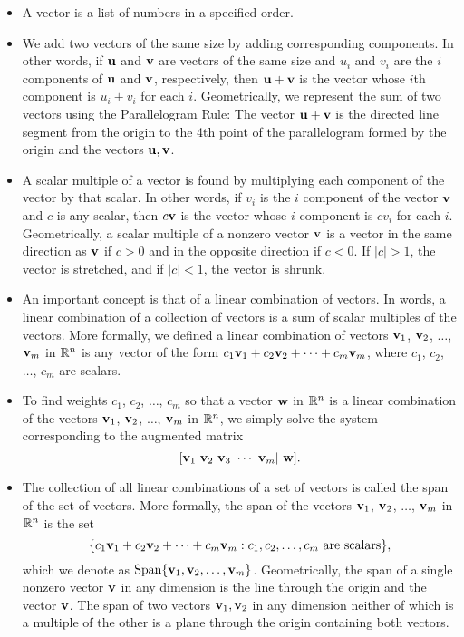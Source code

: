 \begin{itemize}
\item A vector is a list of numbers in a specified order. 
\item We add two vectors of the same size by adding corresponding components. In other words, if $\mathbf{u}$ and $\mathbf{v}$ are vectors of the same size and $u_i$ and $v_i$ are the $i$ components of $\mathbf{u}$ and $\mathbf{v}$, respectively, then $\mathbf{u} +\mathbf{v}$ is the vector whose $i$th component is $u_i+v_i$ for each $i$. Geometrically, we represent the sum of two vectors using the Parallelogram Rule: The vector $\mathbf{u}+\mathbf{v}$ is the directed line segment from the origin to the 4th point of the parallelogram formed by the origin and the vectors $\mathbf{u}, \mathbf{v}$.
\item A scalar multiple of a vector is found by multiplying each component of the vector by that scalar. In other words, if $v_i$ is the $i$ component of the vector $\mathbf{v}$ and $c$ is any scalar, then $c\mathbf{v}$ is the vector whose $i$ component is $cv_i$ for each $i$. Geometrically, a scalar multiple of a nonzero vector $\mathbf{v}$ is a vector in the same direction as $\mathbf{v}$ if $c>0$ and in the opposite direction if $c<0$. If $|c|>1$, the vector is stretched, and if $|c|<1$, the vector is shrunk.
\item An important concept is that of a linear combination of vectors. In words, a linear combination of a collection of vectors is a sum of scalar multiples of the vectors. More formally, we defined a linear combination of vectors $\mathbf{v}_1$, $\mathbf{v}_2$, $\ldots$, $\mathbf{v}_m$ in $\mathbb{R}^n$ is any vector of the form $c_1 \mathbf{v}_1 + c_2 \mathbf{v}_2 + \cdots + c_m \mathbf{v}_m$, where $c_1$, $c_2$, $\ldots$, $c_m$ are scalars.
\item To find weights $c_1$, $c_2$, $\ldots$, $c_m$ so that a vector $\mathbf{w}$ in $\mathbb{R}^n$ is a linear combination of the vectors $\mathbf{v}_1$, $\mathbf{v}_2$, $\ldots$, $\mathbf{v}_m$ in $\mathbb{R}^n$, we simply solve the system corresponding to the augmented matrix
\[[\vv_1 \  \vv_2 \  \vv_3 \ \cdots \ \vv_m | \ \vw].\]
\item The collection of all linear combinations of a set of vectors is called the span of the set of vectors. More formally, the span of the vectors $\mathbf{v}_1$, $\mathbf{v}_2$, $\ldots$, $\mathbf{v}_m$ in $\mathbb{R}^n$ is the set
\[\{c_1\mathbf{v}_1 + c_2\mathbf{v}_2 + \cdots + c_m\mathbf{v}_m : c_1, c_2, \ldots, c_m \text{ are scalars}\},\]
which we denote as $\text{Span} \{\mathbf{v}_1, \mathbf{v}_2, \ldots, \mathbf{v}_m\}$. 
Geometrically, the span of a single nonzero vector $\mathbf{v}$ in any dimension is the line through the origin and the vector $\mathbf{v}$. The span of two vectors $\mathbf{v}_1, \mathbf{v}_2$ in any dimension neither of which is a multiple of the other is a plane through the origin containing both vectors.
\end{itemize}




